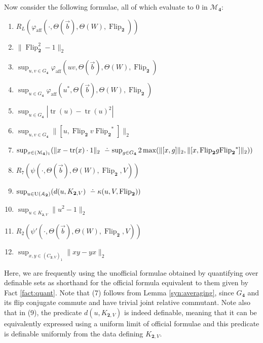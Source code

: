 \documentclass[12pt]{amsart}
\numberwithin{equation}{section}
\theoremstyle{definition}
\newcommand{\dminus}{ 
\buildrel\textstyle\ .\over{\hbox{ 
\vrule height3pt depth0pt width0pt}{\smash-} 
}}
\def\M{\mathcal{M}}
\DeclareMathOperator{\tr}{tr}
\def \M{\mathcal{M}}
\def \A{\mathcal{A}}
\begin{document}
Now consider the following formulae, all of which evaluate to $0$ in $\M_{\mathbf{4}}$:

\begin{enumerate}
    \item $R_L(\varphi_{\operatorname{aff}}(\cdot,\Theta(\vec b),\Theta(W),\operatorname{Flip}_{\mathbf{2}}))$
    \item $\|\operatorname{Flip}_{\mathbf{2}}^2-1\|_2$
    \item $\sup_{u,v\in G_\mathbf{4}}\varphi_{\operatorname{aff}}(uv,\Theta(\vec b),\Theta(W),\operatorname{Flip}_{\mathbf{2}})$
    \item $\sup_{u\in G_\mathbf{4}}\varphi_{\operatorname{aff}}(u^*,\Theta(\vec b),\Theta(W),\operatorname{Flip}_{\mathbf{2}})$
    \item $\sup_{u\in G_\mathbf{4}}|\tr(u)-\tr({u})^2|$
    \item $\sup_{u,v\in G_\mathbf{4}}\|[u,{\operatorname{Flip}_{\mathbf{2}}}v{\operatorname{Flip}_{\mathbf{2}}}^*]\|_2$
    \item $\sup_{x\in {(\M_{\mathbf{4}})_1}}(\|x-\tr(x)\cdot 1\|_2\dminus \sup_{g\in G_{\mathbf{4}}}2\max(\|[x,g]\|_2,\|[x,{\operatorname{Flip}_{\mathbf{2}}}g{\operatorname{Flip}_{\mathbf{2}}}^*]\|_2))$
    \item $R_7(\psi(\cdot,\Theta(\vec b),\Theta(W),\operatorname{Flip}_{\mathbf{2}},V))$
    \item $\sup_{u\in \mathrm{U}(\A_{\mathbf{2}})}(d(u,K_{\mathbf{2},V})\dminus \kappa(u,V,\operatorname{Flip}_{\mathbf{2}}))$
    \item $\sup_{u\in K_{\mathbf{2},V}} \|u^2-1\|_2$
    \item $R_2(\psi'(\cdot,\Theta(\vec b),\Theta(W),\operatorname{Flip}_{\mathbf{2}},V))$
    \item $\sup_{x,y\in {(C_{\mathbf{2},V})_1}}\|xy-yx\|_2$
\end{enumerate}

Here, we are frequently using the unofficial formulae obtained by  quantifying over definable sets as shorthand for the official formula equivalent to them given by Fact \ref{fact:quant}. Note that (7) follows from Lemma \ref{syn:averaging}, since $G_{\mathbf4}$ and its flip conjugate commute
and have trivial joint relative commutant.  Note also that in (9), the predicate $d(u,K_{\mathbf{2},V})$ is indeed definable, meaning that it can be equivalently expressed using a uniform limit of official formulae and this predicate is definable uniformly from the data defining $K_{\mathbf{2},V}$. 
\end{document}
